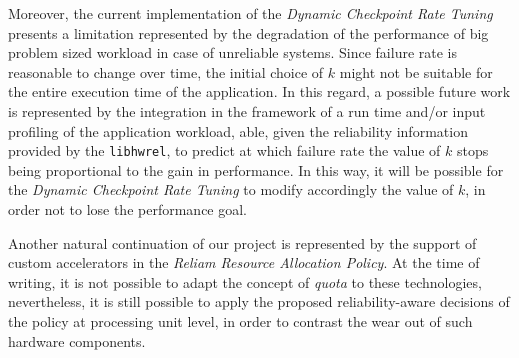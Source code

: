 Moreover, the current implementation of the \emph{Dynamic Checkpoint Rate Tuning} presents a limitation represented by the degradation of the performance of big problem sized workload in case of unreliable systems. Since failure rate is reasonable to change over time, the initial choice of $k$ might not be suitable for the entire execution time of the application. In this regard, a possible future work is represented by the integration in the framework of a run time and/or input profiling of the application workload, able, given the reliability information provided by the \verb|libhwrel|, to predict at which failure rate the value of $k$ stops being proportional to the gain in performance. In this way, it will be possible for the \emph{Dynamic Checkpoint Rate Tuning} to modify accordingly the value of $k$, in order not to lose the performance goal.

Another natural continuation of our project is represented by the support of custom accelerators in the \emph{Reliam Resource Allocation Policy}. At the time of writing, it is not possible to adapt the concept of \emph{quota} to these technologies, nevertheless, it is still possible to apply the proposed reliability-aware decisions of the policy at processing unit level, in order to contrast the wear out of such hardware components.